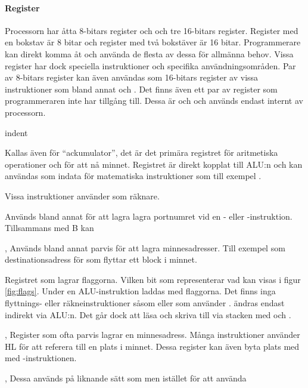 \documentclass[main.tex]{subfiles}
\begin{document}
\paragraph{Register}
    Processorn har åtta 8-bitars register och och tre 16-bitars register.
    Register med en bokstav är 8 bitar och register med två bokstäver är 16
    bitar. Programmerare kan direkt komma åt och använda de flesta av dessa för
    allmänna behov. Vissa register har dock speciella instruktioner och
    specifika användningsområden. Par av 8-bitars register kan även användas
    som 16-bitars register av vissa instruktioner som bland annat  och . Det finns även ett par av register som
    programmeraren inte har tillgång till. Dessa är  och  och
    används endast internt av processorn.
\begin{labeling}{indent}
\item[\mono{A}]
    Kallas även för ``ackumulator'', det är det primära registret för
    aritmetiska operationer och för att nå minnet. Registret är direkt kopplat
    till ALU:n och kan användas som indata för matematiska instruktioner som
    till exempel .
\item[\mono{B}]
    Vissa instruktioner använder  som räknare.
\item[\mono{C}]
    Används bland annat för att lagra lagra portnumret vid en - eller
    -instruktion. Tillsammans med B kan
\item[\mono{D}, \mono{E}]
    Används bland annat parvis för att lagra minnesadresser. Till exempel som
    destinationsadress för  som flyttar ett block i minnet.
\item[\mono{F}]
    Registret som lagrar flaggorna. Vilken bit som representerar vad kan visas
    i figur \ref{fig:flags}. Under en ALU-instruktion laddas  med
    flaggorna. Det finns inga flyttnings- eller räkneinstruktioner såsom
     eller  som använder .  ändras endast
    indirekt via ALU:n. Det går dock att läsa och skriva till  via
    stacken med  och .
\item[\mono{H}, \mono{L}]
    Register som ofta parvis lagrar en minnesadress. Många instruktioner
    använder HL för att referera till en plats i minnet.  Dessa register kan
    även byta plats med  med -instruktionen.
\item[\mono{IX}, \mono{IY}]
    Dessa används på liknande sätt som  men istället för att använda

\end{labeling}
\end{document}
